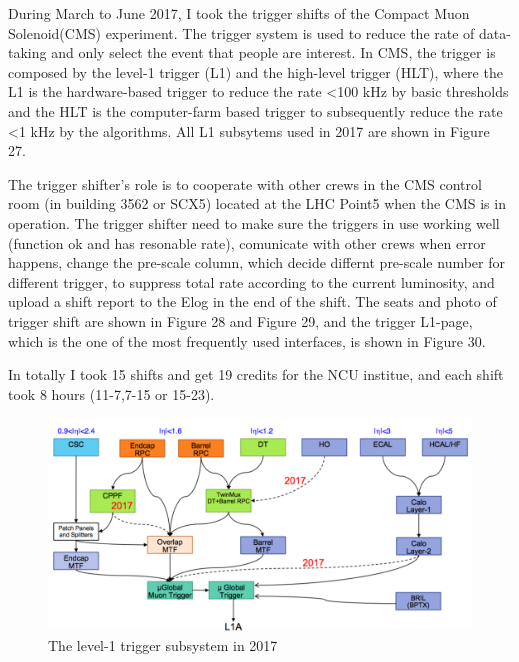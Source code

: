 \documentclass{article}
\begin{document}
During March to June 2017, I took the trigger shifts of the Compact Muon Solenoid(CMS) experiment. The trigger system is used to reduce the rate of data-taking and only select the event that people are interest. In CMS, the trigger is composed by the level-1 trigger (L1) and the high-level trigger (HLT), where the L1 is the hardware-based trigger to reduce the rate \textless  100 kHz by basic thresholds and the HLT is the computer-farm based trigger to subsequently reduce the rate \textless 1 kHz by the algorithms. All L1 subsytems used in 2017 are shown in Figure 27. 

The trigger shifter's role is to cooperate with other crews in the CMS control room (in building 3562 or SCX5) located at the LHC Point5 when the CMS is in operation. The trigger shifter need to make sure the triggers in use working well (function ok and has resonable rate), comunicate with other crews when error happens, change the pre-scale column, which decide differnt pre-scale number for different trigger, to suppress total rate according to the current luminosity, and upload a shift report to the Elog in the end of the shift. The seats and photo of trigger shift are shown in Figure 28 and Figure 29, and the trigger L1-page, which is the one of the most frequently used interfaces, is shown in Figure 30.   

In totally I took 15 shifts and get 19 credits for the NCU institue, and each shift took 8 hours (11-7,7-15 or 15-23).

\begin{figure}
\centering
\includegraphics[width=1.\textwidth]{figures/TriggerShift_subsystem.pdf}
\caption{The level-1 trigger subsystem in 2017}
\label{pics:blablabla}
\end{figure}
\end{document}
